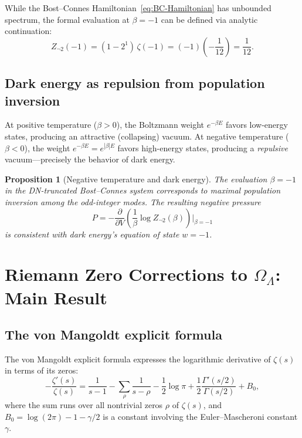 \documentclass[12pt,a4paper]{article}
\newtheorem{proposition}[theorem]{Proposition}
\newcommand{\OL}{\Omega_\Lambda}
\begin{document}
While the Bost--Connes Hamiltonian~\eqref{eq:BC-Hamiltonian} has unbounded spectrum, the formal evaluation at $\beta = -1$ can be defined via analytic continuation:
\begin{equation}
  Z_{\neg 2}(-1) = (1 - 2^{1})\,\zeta(-1) = (-1)\!\left(-\frac{1}{12}\right) = \frac{1}{12}.
\end{equation}

\subsection{Dark energy as repulsion from population inversion}

At positive temperature ($\beta > 0$), the Boltzmann weight $e^{-\beta E}$ favors low-energy states, producing an attractive (collapsing) vacuum. At negative temperature ($\beta < 0$), the weight $e^{-\beta E} = e^{|\beta|E}$ favors high-energy states, producing a \emph{repulsive} vacuum---precisely the behavior of dark energy.

\begin{proposition}[Negative temperature and dark energy]
The evaluation $\beta = -1$ in the DN-truncated Bost--Connes system corresponds to maximal population inversion among the odd-integer modes. The resulting negative pressure
\begin{equation}
  P = -\frac{\partial}{\partial V}\left(\frac{1}{\beta}\log Z_{\neg 2}(\beta)\right)\bigg|_{\beta=-1}
\end{equation}
is consistent with dark energy's equation of state $w = -1$.
\end{proposition}

\section{Riemann Zero Corrections to $\OL$: Main Result}
\label{sec:main}

\subsection{The von Mangoldt explicit formula}

The von Mangoldt explicit formula expresses the logarithmic derivative of $\zeta(s)$ in terms of its zeros:
\begin{equation}\label{eq:vonMangoldt}
  -\frac{\zeta'(s)}{\zeta(s)} = \frac{1}{s-1} - \sum_\rho \frac{1}{s-\rho} - \frac{1}{2}\log\pi + \frac{1}{2}\frac{\Gamma'(s/2)}{\Gamma(s/2)} + B_0,
\end{equation}
where the sum runs over all nontrivial zeros $\rho$ of $\zeta(s)$, and $B_0 = \log(2\pi) - 1 - \gamma/2$ is a constant involving the Euler--Mascheroni constant $\gamma$.
\end{document}
